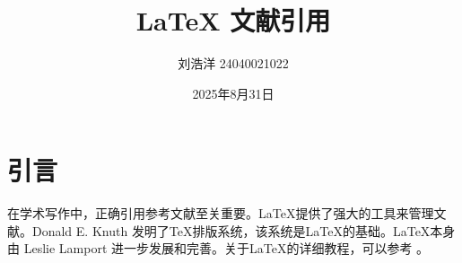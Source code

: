 \documentclass{article}
\title{LaTeX 文献引用}
\author{刘浩洋 24040021022}
\date{2025年8月31日}
\begin{document}
\maketitle

\section{引言}
在学术写作中，正确引用参考文献至关重要。LaTeX提供了强大的工具来管理文献。Donald E. Knuth \cite{knuth1984} 发明了TeX排版系统，该系统是LaTeX的基础。LaTeX本身由 Leslie Lamport \cite{lamport1994} 进一步发展和完善。关于LaTeX的详细教程，可以参考 \cite{wiki2025}。

\end{document}
